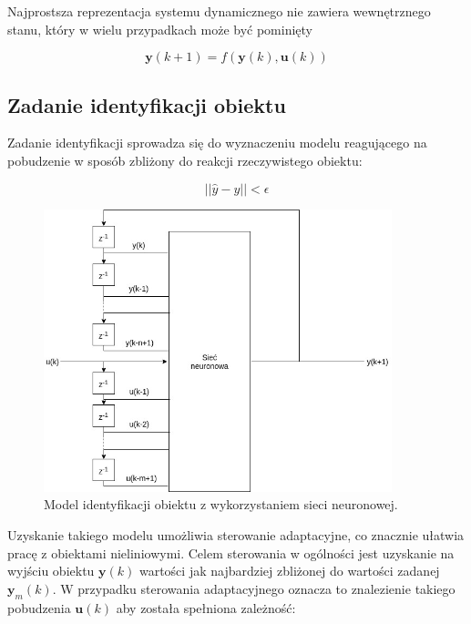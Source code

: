 \documentclass{article}
\newcommand{\bb}{\textbf}
\begin{document}
Najprostsza reprezentacja systemu dynamicznego nie zawiera wewnętrznego stanu, który w wielu przypadkach może być pominięty

\begin{equation}
	\bb{y}(k+1) = f(\bb{y}(k),\bb{u}(k))
\end{equation}

\subsection{Zadanie identyfikacji obiektu}

Zadanie identyfikacji sprowadza się do wyznaczeniu modelu reagującego na pobudzenie w sposób zbliżony do reakcji rzeczywistego obiektu:

\begin{equation}
	|| \hat{y} - y || < \epsilon
	\label{warunek}
\end{equation}

\begin{figure}
\centering
	\includegraphics[width=0.90\textwidth]{ident.jpg}\par\vspace{1cm}
\caption{Model identyfikacji obiektu z wykorzystaniem sieci neuronowej.}
	\label{fig:identyfikacja}
\end{figure}

Uzyskanie takiego modelu umożliwia sterowanie adaptacyjne, co znacznie ułatwia pracę z obiektami nieliniowymi. Celem sterowania w ogólności jest uzyskanie na wyjściu obiektu $\bb{y}(k)$ wartości jak najbardziej zbliżonej do wartości zadanej $\bb{y}_m(k)$. W przypadku sterowania adaptacyjnego oznacza to znalezienie takiego pobudzenia $\bb{u}(k)$ aby została spełniona zależność:
\end{document}
